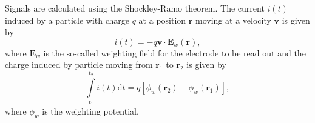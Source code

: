 Signals are calculated using the Shockley-Ramo theorem. 
The current \(i\left(t\right)\) induced by a particle with charge 
\(q\) at a position \(\mathbf{r}\) moving at a velocity \(\mathbf{v}\)
is given by
\begin{equation}\label{Eqn:RamoShockleyWeightingField}
  i\left(t\right) = -q \mathbf{v} \cdot \mathbf{E}_{w}\left(\mathbf{r}\right),
\end{equation}
where \(\mathbf{E}_{w}\) is the so-called weighting field for the 
electrode to be read out and the charge induced by particle moving from 
$\mathbf{r}_{1}$ to $\mathbf{r}_{2}$ is given by
\begin{equation}\label{Eqn:RamoShockleyWeightingPotential}
  \int\limits_{t_{1}}^{t_{2}}i\left(t\right)\text{d}t = q\left[\phi_{w}\left(\mathbf{r}_{2}\right) - \phi_{w}\left(\mathbf{r}_{1}\right)\right],
\end{equation} 
where $\phi_{w}$ is the weighting potential.

